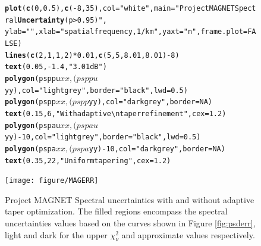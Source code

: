 \documentclass{article}\usepackage{graphicx, color}
\makeatletter
\newcommand{\hlfunctioncall}[1]{\textcolor[rgb]{0.501960784313725,0,0.329411764705882}{\textbf{#1}}}%
\newcommand{\hlstring}[1]{\textcolor[rgb]{0.6,0.6,1}{#1}}%
\newenvironment{kframe}{%
 \def\at@end@of@kframe{}%
 \ifinner\ifhmode%
  \def\at@end@of@kframe{\end{minipage}}%
  \begin{minipage}{\columnwidth}%
 \fi\fi%
 \def\FrameCommand##1{\hskip\@totalleftmargin \hskip-\fboxsep
 \colorbox{shadecolor}{##1}\hskip-\fboxsep
     \hskip-\linewidth \hskip-\@totalleftmargin \hskip\columnwidth}%
 \MakeFramed {\advance\hsize-\width
   \@totalleftmargin\z@ \linewidth\hsize
   \@setminipage}}%
 {\par\unskip\endMakeFramed%
 \at@end@of@kframe}
\newenvironment{knitrout}{}{} %
\makeatother
\begin{document}
\begin{figure}[htb!]
\begin{center}
\begin{knitrout}
\color{fgcolor}\begin{kframe}
\begin{alltt}
\hlfunctioncall{plot}(\hlfunctioncall{c}(0, 0.5), \hlfunctioncall{c}(-8, 35), col = \hlstring{"white"}, main = \hlstring{"Project MAGNET Spectral \hlfunctioncall{Uncertainty} (p > 0.95)"}, 
    ylab = \hlstring{""}, xlab = \hlstring{"spatial frequency, 1/km"}, yaxt = \hlstring{"n"}, frame.plot = FALSE)
\hlfunctioncall{lines}(\hlfunctioncall{c}(2, 1, 1, 2) * 0.01, \hlfunctioncall{c}(5, 5, 8.01, 8.01) - 8)
\hlfunctioncall{text}(0.05, -1.4, \hlstring{"3.01 dB"})
\hlfunctioncall{polygon}(psppu$xx, (psppu$yy), col = \hlstring{"light grey"}, border = \hlstring{"black"}, lwd = 0.5)
\hlfunctioncall{polygon}(pspp$xx, (pspp$yy), col = \hlstring{"dark grey"}, border = NA)
\hlfunctioncall{text}(0.15, 6, \hlstring{"With adaptive\textbackslash{}ntaper refinement"}, cex = 1.2)
\hlfunctioncall{polygon}(pspau$xx, (pspau$yy) - 10, col = \hlstring{"light grey"}, border = \hlstring{"black"}, lwd = 0.5)
\hlfunctioncall{polygon}(pspa$xx, (pspa$yy) - 10, col = \hlstring{"dark grey"}, border = NA)
\hlfunctioncall{text}(0.35, 22, \hlstring{"Uniform tapering"}, cex = 1.2)
\end{alltt}
\end{kframe}
\texttt{[image: figure/MAGERR]} 

\end{knitrout}

\caption{Project MAGNET Spectral uncertainties with and without adaptive taper optimization.
The filled regions encompass the spectral uncertainties values based on the
curves shown in Figure \ref{fig:psderr}, light and dark for the
upper $\chi_\nu^2$ and approximate values respectively.
}
\label{fig:magerr}
\end{center}
\end{figure}
\end{document}

